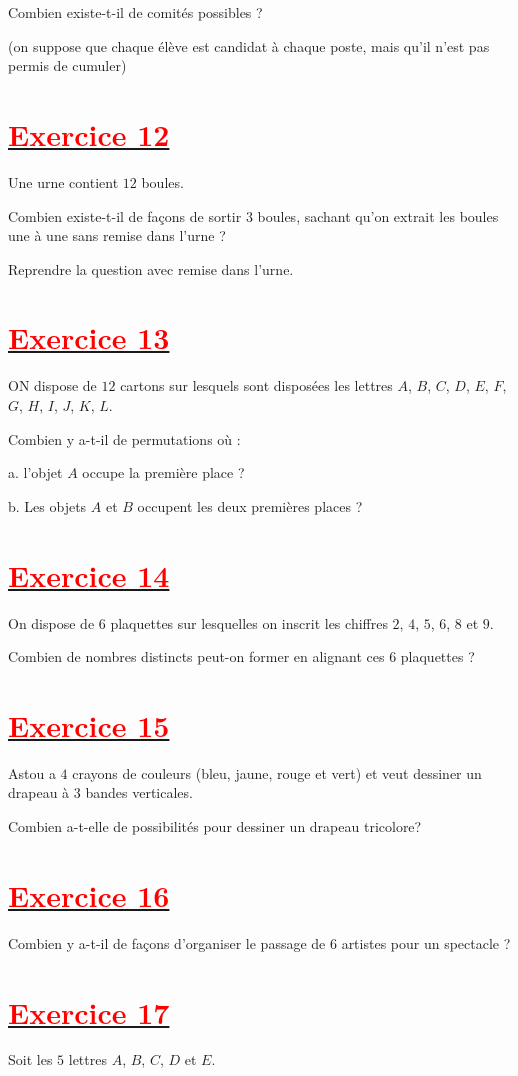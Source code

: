\documentclass[12pt]{article}
\begin{document}
Combien existe-t-il de comités possibles ?

	(on suppose que chaque élève est candidat à chaque poste, mais qu'il n'est pas permis de cumuler)
\section*{\underline{\textbf{\textcolor{red}{Exercice 12}}}}
Une urne contient $12$ boules.

Combien existe-t-il de façons de sortir $3$ boules, sachant qu'on extrait les boules une à une sans remise dans l'urne ?

Reprendre la question avec remise dans l'urne.
\section*{\underline{\textbf{\textcolor{red}{Exercice 13}}}}
ON dispose de $12$ cartons sur lesquels sont disposées les lettres $A$, $B$, $C$, $D$, $E$, $F$, $G$, $H$, $I$, $J$, $K$, $L.$ 

Combien y a-t-il de permutations où :

a. l'objet $A$ occupe la première place ?

b. Les objets $A$ et $B$ occupent les deux premières places ?
\section*{\underline{\textbf{\textcolor{red}{Exercice 14}}}}
On dispose de $6$ plaquettes sur lesquelles on inscrit les chiffres $2$, $4$, $5$, $6$, $8$ et $9.$

Combien de nombres distincts peut-on former en alignant ces $6$ plaquettes ?
\section*{\underline{\textbf{\textcolor{red}{Exercice 15}}}}
Astou a $4$ crayons de couleurs (bleu, jaune, rouge et vert) et veut dessiner un drapeau à $3$ bandes verticales.


Combien a-t-elle de possibilités pour dessiner un drapeau tricolore?
\section*{\underline{\textbf{\textcolor{red}{Exercice 16}}}}
Combien y a-t-il de façons d'organiser le passage de $6$ artistes pour un spectacle ?
\section*{\underline{\textbf{\textcolor{red}{Exercice 17}}}}
Soit les $5$ lettres $A$, $B$, $C$, $D$ et $E.$
\end{document}
